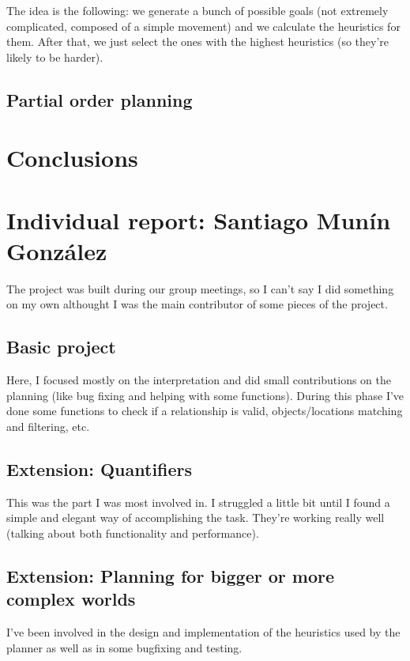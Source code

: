 \documentclass[11pt]{article}
\begin{document}
        The idea is the following: we generate a bunch of possible goals (not extremely complicated, composed 
        of a simple movement) and we calculate the heuristics for them. After that, we just select the ones with 
        the highest heuristics (so they're likely to be harder).
	\subsection{Partial order planning}

	\section{Conclusions}

\newpage
\appendix
\section{Individual report: Santiago Munín González}
The project was built during our group meetings, so I can't say I did something on my own althought I 
was the main contributor of some pieces of the project.

\subsection{Basic project}

Here, I focused mostly on the interpretation and did small contributions on the planning (like bug fixing and 
helping with some functions). During this phase I've done some functions to check if a relationship is valid, 
objects/locations matching and filtering, etc.

\subsection{Extension: Quantifiers}

This was the part I was most involved in. I struggled a little 
bit until I found a simple and elegant way of accomplishing the task. They're working really well (talking about both functionality and performance).

\subsection{Extension: Planning for bigger or more complex worlds}

I've been involved in the design and implementation of the heuristics used by the planner as well as in some 
bugfixing and testing.
\end{document}
